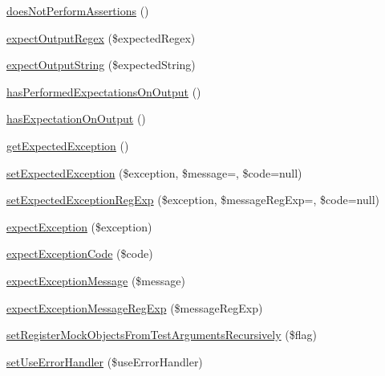 \begin{DoxyCompactItemize}
\item 
\mbox{\hyperlink{class_p_h_p_unit___framework___test_case_a8e9432af29804e076e0c8c85a32eb0b0}{does\+Not\+Perform\+Assertions}} ()
\item 
\mbox{\hyperlink{class_p_h_p_unit___framework___test_case_a64c9b481610caebb7c09fe9c9e031e58}{expect\+Output\+Regex}} (\$expected\+Regex)
\item 
\mbox{\hyperlink{class_p_h_p_unit___framework___test_case_adf21a73e87d1315e1036ddead293894c}{expect\+Output\+String}} (\$expected\+String)
\item 
\mbox{\hyperlink{class_p_h_p_unit___framework___test_case_af8e185293ccee809212507250ed653d2}{has\+Performed\+Expectations\+On\+Output}} ()
\item 
\mbox{\hyperlink{class_p_h_p_unit___framework___test_case_a74eb482ac0921b7c5069cf3d8c00f033}{has\+Expectation\+On\+Output}} ()
\item 
\mbox{\hyperlink{class_p_h_p_unit___framework___test_case_ac3da317b371564f39a4a4bfec3f44776}{get\+Expected\+Exception}} ()
\item 
\mbox{\hyperlink{class_p_h_p_unit___framework___test_case_acdacc1841deca28fc725c4d174f6caad}{set\+Expected\+Exception}} (\$exception, \$message=\textquotesingle{}\textquotesingle{}, \$code=null)
\item 
\mbox{\hyperlink{class_p_h_p_unit___framework___test_case_a4e6d8163570f3bc4747740a8a0d55440}{set\+Expected\+Exception\+Reg\+Exp}} (\$exception, \$message\+Reg\+Exp=\textquotesingle{}\textquotesingle{}, \$code=null)
\item 
\mbox{\hyperlink{class_p_h_p_unit___framework___test_case_ae0b518950cd43d617a7a356919ed389d}{expect\+Exception}} (\$exception)
\item 
\mbox{\hyperlink{class_p_h_p_unit___framework___test_case_a772e8a7fb5f1876b8e689a562c8d1b6b}{expect\+Exception\+Code}} (\$code)
\item 
\mbox{\hyperlink{class_p_h_p_unit___framework___test_case_abe15348ee26ae0e75c9a054cb1c10fa0}{expect\+Exception\+Message}} (\$message)
\item 
\mbox{\hyperlink{class_p_h_p_unit___framework___test_case_a1966e97bc0129b00d6917ab9c09f9b21}{expect\+Exception\+Message\+Reg\+Exp}} (\$message\+Reg\+Exp)
\item 
\mbox{\hyperlink{class_p_h_p_unit___framework___test_case_afc571c4a180438ad4cd88f4031b48463}{set\+Register\+Mock\+Objects\+From\+Test\+Arguments\+Recursively}} (\$flag)
\item 
\mbox{\hyperlink{class_p_h_p_unit___framework___test_case_a202704331ba4b2b85083b105a30fed3c}{set\+Use\+Error\+Handler}} (\$use\+Error\+Handler)

\end{DoxyCompactItemize}

